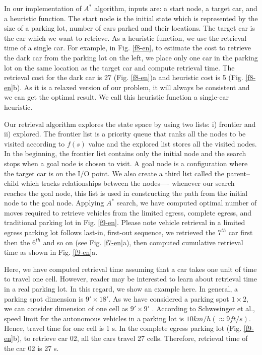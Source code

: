 In our implementation of $A^*$ algorithm, inputs are: a start node, a target car, and a heuristic function. The start node is the initial state which is represented by the size of a parking lot, number of cars parked and their locations. The target car is the car which we want to retrieve. As a heuristic function, we use the retrieval time of a single car. For example, in Fig. \ref{f8-en}, to estimate the cost to retrieve the dark car from the parking lot on the left, we place only one car in the parking lot on the same location as the target car and compute retrieval time. The retrieval cost for the dark car is 27 (Fig. \ref{f8-en})a and heuristic cost is 5 (Fig. \ref{f8-en}b). As it is a relaxed version of our problem, it will always be consistent and we can get the optimal result. We call this heuristic function a single-car heuristic.

Our retrieval algorithm explores the state space by using two lists: i) frontier and ii) explored. The frontier list is a priority queue that ranks all the nodes to be visited according to $f(s)$ value and the explored list stores all the visited nodes. In the beginning, the frontier list contains only the initial node and the search stops when a goal node is chosen to visit. A goal node is a configuration where the target car is on the I/O point. We also create a third list called the parent–child which tracks relationships between the nodes—- whenever our search reaches the goal node, this list is used in constructing the path from the initial node to the goal node. Applying $A^*$ search, we have computed optimal number of moves required to retrieve vehicles from the limited egress, complete egress, and traditional parking lot in Fig. \ref{f9-en}. Please note vehicle retrieval in a limited egress parking lot follows last-in, first-out sequence, we retrieved the $7^{th}$ car first then the $6^{th}$ and so on (see Fig. \ref{f7-en}a), then computed cumulative retrieval time as shown in Fig. \ref{f9-en}a.


Here, we have computed retrieval time assuming that a car takes one unit of time to travel one cell. However, reader may be interested to learn about retrieval time in a real parking lot. In this regard, we show an example here. In general, a parking spot dimension is $9' \times 18'$. As we have considered a parking spot $1 \times 2$, we can consider dimension of one cell as $9' \times 9'$ . According to Schwesinger et al., speed limit for the autonomous vehicles in a parking lot is $10 km/h (≈ 9ft/s)$. Hence, travel time for one cell is 1 s. In the complete egress parking lot (Fig. \ref{f9-en}b), to retrieve car 02, all the cars travel 27 cells. Therefore, retrieval time of the car 02 is 27 s.
